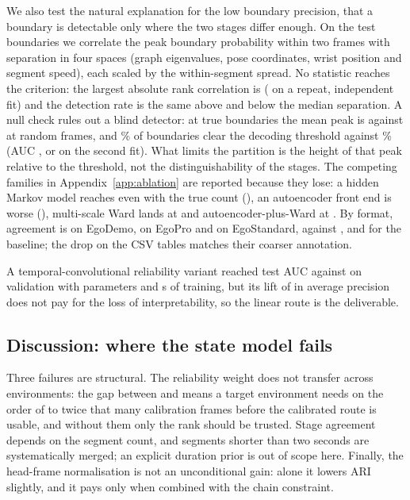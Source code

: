 \documentclass{swmcmthesis}
\begin{document}
We also test the natural explanation for the low boundary precision, that a boundary
is detectable only where the two stages differ enough. On the \slotPIdNBound{} test
boundaries we correlate the peak boundary probability within two frames with separation in
four spaces (graph eigenvalues, pose coordinates, wrist position and segment speed), each
scaled by the within-segment spread. No statistic reaches the criterion: the largest
absolute rank correlation is \slotPIdSpearmanMax{} (\slotPIdSpearmanRobust{} on a repeat,
independent fit) and the detection rate is the same above and below the median separation.
A null check rules out a blind detector: at true boundaries the mean peak is
\slotPIdMeanTrue{} against \slotPIdMeanNull{} at random frames, and \slotPIdTrueHalf{}\% of
boundaries clear the decoding threshold against \slotPIdNullHalf{}\% (AUC
\slotPIdAucTwo{}, or \slotPIdAucTwoRobust{} on the second fit). What limits the partition is
the height of that peak relative to the threshold, not the distinguishability of the
stages. The competing families in Appendix~\ref{app:ablation} are reported because they
lose: a hidden Markov model reaches \slotPSegHMMARI{} even with the true count
(\slotPSegHMMOracleARI{}), an autoencoder front end is worse (\slotPSegAEHMMARI{}),
multi-scale Ward lands at \slotPSegWardMSARI{} and autoencoder-plus-Ward at
\slotPSegAEWardARI{}. By format, agreement is \slotPSegDemoWard{} on EgoDemo,
\slotPSegProWard{} on EgoPro and \slotPSegStdWard{} on EgoStandard, against
\slotPSegDemoRaw{}, \slotPSegProRaw{} and \slotPSegStdRaw{} for the baseline; the drop on
the CSV tables matches their coarser annotation.

A temporal-convolutional reliability variant reached test AUC \slotPTCNAUC{} against
\slotPTCNValAUC{} on validation with \slotPTCNParams{} parameters and \slotPTCNSeconds{} s
of training, but its lift of \slotPTCNAPLift{} in average precision does not pay for the
loss of interpretability, so the linear route is the deliverable.

\subsection{Discussion: where the state model fails}
\label{sec:pone_discussion}
\label{sec:p1disc}

Three failures are structural. The reliability weight does not transfer across
environments: the gap between \slotPEnvOneAUC{} and \slotPEnvTwoAUC{} means a target
environment needs on the order of \slotCtx{} to twice that many calibration frames before
the calibrated route is usable, and without them only the rank should be trusted. Stage
agreement depends on the segment count, and segments shorter than two seconds are
systematically merged; an explicit duration prior is out of scope here. Finally, the
head-frame normalisation is not an unconditional gain: alone it lowers ARI slightly, and
it pays only when combined with the chain constraint.
\end{document}
